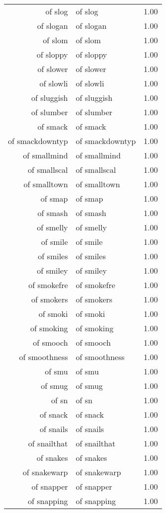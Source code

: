 \begin{table}[ht]
\begin{tabular}{rlr}
  of slog & of slog & 1.00 \\ 
  of slogan & of slogan & 1.00 \\ 
  of slom & of slom & 1.00 \\ 
  of sloppy & of sloppy & 1.00 \\ 
  of slower & of slower & 1.00 \\ 
  of slowli & of slowli & 1.00 \\ 
  of sluggish & of sluggish & 1.00 \\ 
  of slumber & of slumber & 1.00 \\ 
  of smack & of smack & 1.00 \\ 
  of smackdowntyp & of smackdowntyp & 1.00 \\ 
  of smallmind & of smallmind & 1.00 \\ 
  of smallscal & of smallscal & 1.00 \\ 
  of smalltown & of smalltown & 1.00 \\ 
  of smap & of smap & 1.00 \\ 
  of smash & of smash & 1.00 \\ 
  of smelly & of smelly & 1.00 \\ 
  of smile & of smile & 1.00 \\ 
  of smiles & of smiles & 1.00 \\ 
  of smiley & of smiley & 1.00 \\ 
  of smokefre & of smokefre & 1.00 \\ 
  of smokers & of smokers & 1.00 \\ 
  of smoki & of smoki & 1.00 \\ 
  of smoking & of smoking & 1.00 \\ 
  of smooch & of smooch & 1.00 \\ 
  of smoothness & of smoothness & 1.00 \\ 
  of smu & of smu & 1.00 \\ 
  of smug & of smug & 1.00 \\ 
  of sn & of sn & 1.00 \\ 
  of snack & of snack & 1.00 \\ 
  of snails & of snails & 1.00 \\ 
  of snailthat & of snailthat & 1.00 \\ 
  of snakes & of snakes & 1.00 \\ 
  of snakewarp & of snakewarp & 1.00 \\ 
  of snapper & of snapper & 1.00 \\ 
  of snapping & of snapping & 1.00 \\ 

\end{tabular}
\end{table}

